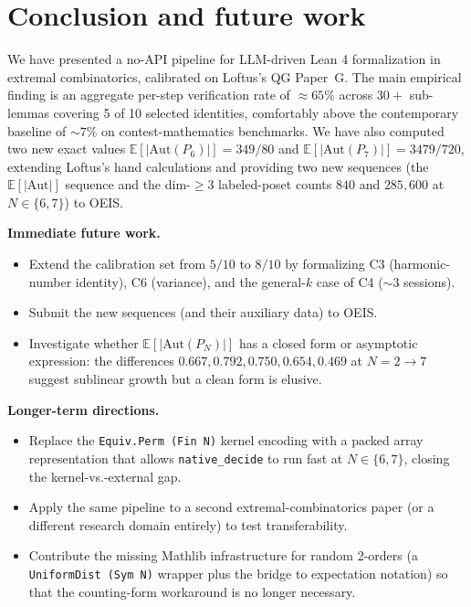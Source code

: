 \documentclass[11pt]{article}
\theoremstyle{definition}
\begin{document}
\section{Conclusion and future work}\label{sec:conclusion}

We have presented a no-API pipeline for LLM-driven Lean 4 formalization in
extremal combinatorics, calibrated on Loftus's QG Paper~G. The main empirical
finding is an aggregate per-step verification rate of $\approx 65\%$ across
$30+$ sub-lemmas covering 5 of 10 selected identities, comfortably above the
contemporary baseline of $\sim 7\%$ on contest-mathematics benchmarks. We have
also computed two new exact values
$\mathbb{E}[|\mathrm{Aut}(P_6)|] = 349/80$ and
$\mathbb{E}[|\mathrm{Aut}(P_7)|] = 3479/720$, extending Loftus's hand
calculations and providing two new sequences (the $\mathbb{E}[|\mathrm{Aut}|]$
sequence and the dim-$\ge 3$ labeled-poset counts $840$ and $285{,}600$ at
$N \in \{6, 7\}$) to OEIS.

\textbf{Immediate future work.}
\begin{itemize}
    \item Extend the calibration set from $5/10$ to $8/10$ by formalizing C3
    (harmonic-number identity), C6 (variance), and the general-$k$ case of C4
    ($\sim 3$ sessions).
    \item Submit the new sequences (and their auxiliary data) to OEIS.
    \item Investigate whether $\mathbb{E}[|\mathrm{Aut}(P_N)|]$ has a closed
    form or asymptotic expression: the differences $0.667, 0.792, 0.750, 0.654,
    0.469$ at $N = 2 \to 7$ suggest sublinear growth but a clean form is
    elusive.
\end{itemize}

\textbf{Longer-term directions.}
\begin{itemize}
    \item Replace the \texttt{Equiv.Perm (Fin N)} kernel encoding with a packed
    array representation that allows \texttt{native\_decide} to run fast at
    $N \in \{6, 7\}$, closing the kernel-vs.-external gap.
    \item Apply the same pipeline to a second extremal-combinatorics paper (or
    a different research domain entirely) to test transferability.
    \item Contribute the missing Mathlib infrastructure for random 2-orders
    (a \texttt{UniformDist (Sym N)} wrapper plus the bridge to expectation
    notation) so that the counting-form workaround is no longer necessary.
\end{itemize}
\end{document}
